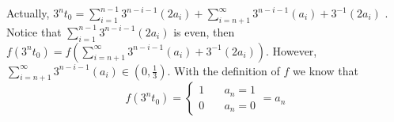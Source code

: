 \documentclass{article}
\begin{document}
Actually,  $ 3^nt_0=\sum\limits_{i=1}^{n-1}3^{n-i-1}(2a_i)+\sum\limits_{i=n+1}^{\infty}3^{n-i-1}(a_i)+3^{-1}(2a_i)   $   .
Notice that   $ \sum\limits_{i=1}^{n-1}3^{n-i-1}(2a_i) $  is even, then  $ f(3^nt_0)=f(\sum\limits_{i=n+1}^{\infty}3^{n-i-1}(a_i)+3^{-1}(2a_i)) $.
However,   $ \sum\limits_{i=n+1}^{\infty}3^{n-i-1}(a_i)\in (0,\frac{1}{3}) $.
With  the definition of  $ f $ we know that  \[ f(3^nt_0)=\left\{
    \begin{aligned}
        1&{}\quad a_n=1\\
        0&{}\quad a_n=0
    \end{aligned}
\right.=a_n \]  
\end{document}
